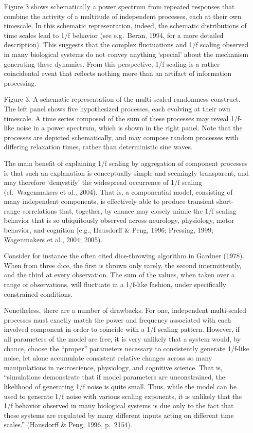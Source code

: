 \documentclass[12pt,]{book}
\begin{document}
Figure 3 shows schematically a power spectrum from repeated responses that combine the activity of a multitude of independent processes, each at their own timescale. In this schematic representation, indeed, the schematic distributions of time scales lead to 1/f behavior (see e.g.~Beran, 1994, for a more detailed description). This suggests that the complex fluctuations and 1/f scaling observed in many biological systems do not convey anything `special' about the mechanism generating these dynamics. From this perspective, 1/f scaling is a rather coincidental event that reflects nothing more than an artifact of information processing.

Figure 3. A schematic representation of the multi-scaled randomness construct. The left panel shows five hypothesized processes, each evolving at their own timescale. A time series composed of the sum of these processes may reveal 1/f-like noise in a power spectrum, which is shown in the right panel. Note that the processes are depicted schematically, and may compose random processes with differing relaxation times, rather than deterministic sine waves.

The main benefit of explaining 1/f scaling by aggregation of component processes is that such an explanation is conceptually simple and seemingly transparent, and may therefore `demystify' the widespread occurrence of 1/f scaling (cf.~Wagenmakers et al., 2004). That is, a componential model, consisting of many independent components, is effectively able to produce transient short-range correlations that, together, by chance may closely mimic the 1/f scaling behavior that is so ubiquitously observed across neurology, physiology, motor behavior, and cognition (e.g., Hausdorff \& Peng, 1996; Pressing, 1999; Wagenmakers et al., 2004; 2005).

Consider for instance the often cited dice-throwing algorithm in Gardner (1978). When from three dice, the first is thrown only rarely, the second intermittently, and the third at every observation. The sum of the values, when taken over a range of observations, will fluctuate in a 1/f-like fashion, under specifically constrained conditions.

Nonetheless, there are a number of drawbacks. For one, independent multi-scaled processes must exactly match the power and frequency associated with each involved component in order to coincide with a 1/f scaling pattern. However, if all parameters of the model are free, it is very unlikely that a system would, by chance, choose the ``proper'' parameters necessary to consistently generate 1/f-like noise, let alone accumulate consistent relative changes across so many manipulations in neuroscience, physiology, and cognitive science. That is, ``simulations demonstrate that if model parameters are unconstrained, the likelihood of generating 1/f noise is quite small. Thus, while the model can be used to generate 1/f noise with various scaling exponents, it is unlikely that the 1/f behavior observed in many biological systems is due only to the fact that these systems are regulated by many different inputs acting on different time scales.'' (Hausdorff \& Peng, 1996, p.~2154).
\end{document}
